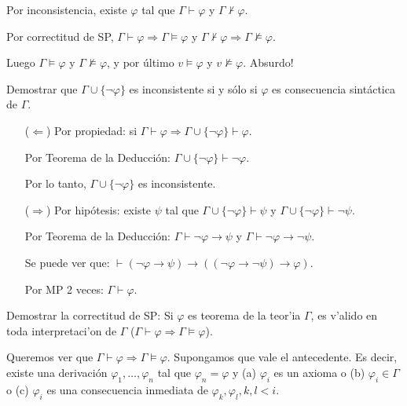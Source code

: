 \begin{questions}
\begin{solution}
Por inconsistencia, existe $\varphi$ tal que $\Gamma \vdash \varphi$ y $\Gamma \nvdash \varphi$.

Por correctitud de SP, $\Gamma\vdash\varphi \Rightarrow \Gamma\vDash\varphi$ y $\Gamma\nvdash\varphi\Rightarrow \Gamma\nvDash\varphi$. 

Luego $\Gamma\vDash\varphi$ y $\Gamma\nvDash\varphi$, y por \'ultimo $v \vDash \varphi$ y $v \nvDash \varphi$. Absurdo!

\end{solution}

\question Demostrar que $\Gamma \cup \{\neg\varphi\}$ es inconsistente si y s\'olo si $\varphi$ es consecuencia sint\'actica de $\Gamma$.

\begin{solution}
 
 \begin{itemize}
  \item[($\Leftarrow$)] Por propiedad: si $\Gamma\vdash\varphi \Rightarrow \Gamma\cup\{\neg\varphi\}\vdash\varphi$.
  
    Por Teorema de la Deducci\'on: $\Gamma\cup\{\neg\varphi\}\vdash\neg\varphi$.
    
    Por lo tanto, $\Gamma\cup\{\neg\varphi\}$ es inconsistente.
  \item[($\Rightarrow$)] Por hip\'otesis: existe $\psi$ tal que $\Gamma\cup\{\neg\varphi\}\vdash\psi$ y $\Gamma\cup\{\neg\varphi\}\vdash\neg\psi$. 
  
  Por Teorema de la Deducci\'on: $\Gamma\vdash\neg\varphi\rightarrow\psi$ y $\Gamma\vdash\neg\varphi\rightarrow\neg\psi$. 
  
  Se puede ver que: $\vdash(\neg\varphi\rightarrow\psi)\rightarrow((\neg\varphi\rightarrow\neg\psi)\rightarrow\varphi)$. 
  
  Por MP 2 veces: $\Gamma\vdash\varphi$.
 \end{itemize}

\end{solution}

\question Demostrar la correctitud de SP: Si $\varphi$ es teorema de la teor'ia $\Gamma$, es v'alido en toda interpretaci'on de $\Gamma$ ($\Gamma \vdash \varphi \Rightarrow \Gamma \vDash \varphi$). 

\begin{solution}

 Queremos ver que $\Gamma\vdash\varphi \Rightarrow \Gamma\vDash\varphi$. Supongamos que vale el antecedente. Es decir, existe una derivaci\'on $\varphi_1, \dots, \varphi_n$ tal que $\varphi_n=\varphi$ y (a) $\varphi_i$ es un axioma o (b) $\varphi_i\in\Gamma$ o (c) $\varphi_i$ es una consecuencia inmediata de $\varphi_k,\varphi_l, k,l<i$.
 

\end{solution}
\end{questions}
